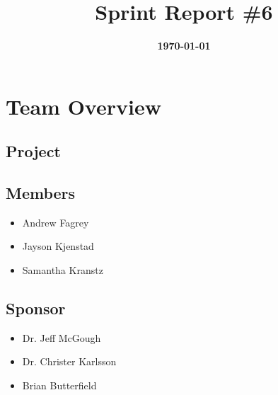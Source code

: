 \documentclass{article}
\title{\normalfont\Large\bfseries\color{TitleColor}Sprint Report \#6}
\date{\normalfont\bfseries\color{TitleColor}\today}
\begin{document}
\maketitle

\section*{Team Overview}
\subsection*{Project}

\subsection*{Members}
\begin{itemize}
	\item Andrew Fagrey
	\item Jayson Kjenstad
	\item Samantha Kranstz
\end{itemize}

\subsection*{Sponsor}
\begin{itemize}
	\item Dr. Jeff McGough
	\item Dr. Christer Karlsson
	\item Brian Butterfield
\end{itemize}
\end{document}

